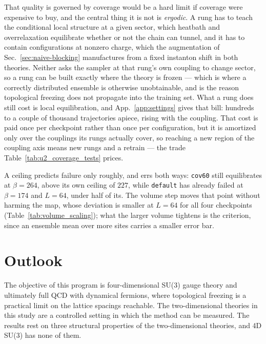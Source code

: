 \documentclass[prd, twocolumn, superscriptaddress, nofootinbib,floatfix]{revtex4-2}
\DeclareRobustCommand{\app}[1]{App.~\ref{app:#1}}
\DeclareRobustCommand{\sect}[1]{Sec.~\ref{sec:#1}}
\DeclareRobustCommand{\tb}[1]{Table~\ref{tab:#1}}
\begin{document}
That quality is governed by coverage would be a hard limit if coverage were
expensive to buy, and the central thing it is not is \emph{ergodic}. A rung has
to teach the conditional local structure at a given sector, which heatbath and
overrelaxation equilibrate whether or not the chain can tunnel, and it has to
contain configurations at nonzero charge, which the augmentation of
\sect{naive-blocking} manufactures from a fixed instanton shift in both
theories. Neither asks the sampler at that rung's own coupling to change sector,
so a rung can be built exactly where the theory is frozen --- which is where a
correctly distributed ensemble is otherwise unobtainable, and is the reason
topological freezing does not propagate into the training set. What a rung does
still cost is local equilibration, and \app{settings} gives that bill: hundreds
to a couple of thousand trajectories apiece, rising with the coupling. That cost
is paid once per checkpoint rather than once per configuration, but it is
amortized only over the couplings its rungs actually cover, so reaching a new
region of the coupling axis means new rungs and a retrain --- the trade
\tb{u2_coverage_tests} prices.

A ceiling predicts failure only roughly, and errs both ways: \texttt{cov60}
still equilibrates at $\beta=264$, above its own ceiling of $227$, while
\texttt{default} has already failed at $\beta=174$ and $L=64$, under half of
its. The volume step moves that point without harming the map, whose deviation
is smaller at $L=64$ for all four checkpoints (\tb{volume_scaling}); what the
larger volume tightens is the criterion, since an ensemble mean over more sites
carries a smaller error bar.

\section{Outlook}
\label{sec:conclusions}
The objective of this program is four-dimensional SU(3) gauge theory and ultimately full QCD with dynamical
fermions,
where topological freezing is a practical limit on the lattice spacings
reachable. The two-dimensional theories in this study are a controlled setting in which
the method can be measured.
The results rest on three structural properties of the two-dimensional theories,
and 4D SU(3) has none of them.
\end{document}
